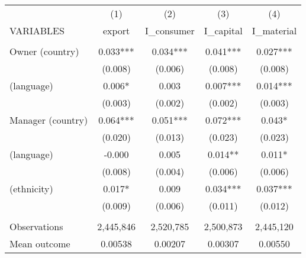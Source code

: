 \begin{tabular}{lcccc} \hline
 & (1) & (2) & (3) & (4) \\
VARIABLES & export & I\_consumer & I\_capital & I\_material \\ \hline
 &  &  &  &  \\
Owner (country) & 0.033*** & 0.034*** & 0.041*** & 0.027*** \\
 & (0.008) & (0.006) & (0.008) & (0.008) \\
(language) & 0.006* & 0.003 & 0.007*** & 0.014*** \\
 & (0.003) & (0.002) & (0.002) & (0.003) \\
Manager (country) & 0.064*** & 0.051*** & 0.072*** & 0.043* \\
 & (0.020) & (0.013) & (0.023) & (0.023) \\
(language) & -0.000 & 0.005 & 0.014** & 0.011* \\
 & (0.008) & (0.004) & (0.006) & (0.006) \\
(ethnicity) & 0.017* & 0.009 & 0.034*** & 0.037*** \\
 & (0.009) & (0.006) & (0.011) & (0.012) \\
 &  &  &  &  \\
Observations & 2,445,846 & 2,520,785 & 2,500,873 & 2,445,120 \\
 Mean outcome & 0.00538 & 0.00207 & 0.00307 & 0.00550 \\ \hline
\end{tabular}
